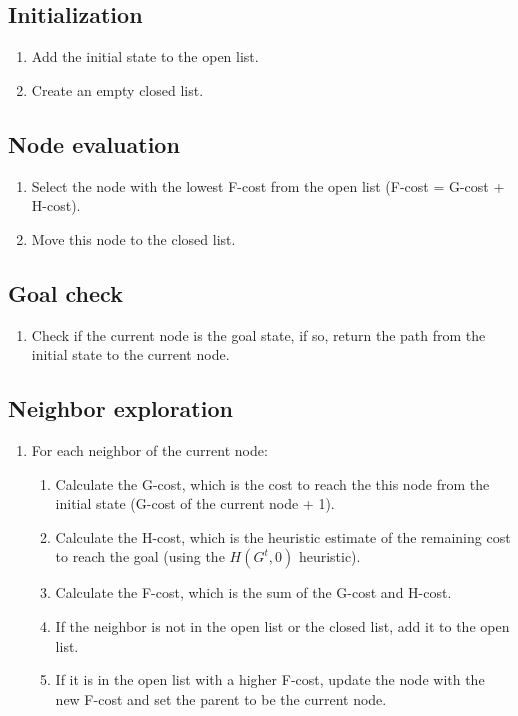\subsection{Initialization}
\begin{enumerate}
    \item Add the initial state to the open list.
    \item Create an empty closed list.
\end{enumerate}

\subsection{Node evaluation}
\begin{enumerate}
    \item Select the node with the lowest F-cost from the open list (F-cost = G-cost + H-cost).
    \item Move this node to the closed list.
\end{enumerate}

\subsection{Goal check}
\begin{enumerate}
    \item Check if the current node is the goal state, if so, return the path from the initial state to the current node.
\end{enumerate}

\subsection{Neighbor exploration}
\begin{enumerate}
    \item For each neighbor of the current node:
    \begin{enumerate}
        \item Calculate the G-cost, which is the cost to reach the this node from the initial state (G-cost of the current node + 1).
        \item Calculate the H-cost, which is the heuristic estimate of the remaining cost to reach the goal (using the $H(G^t, 0)$ heuristic).
        \item Calculate the F-cost, which is the sum of the G-cost and H-cost.
        \item If the neighbor is not in the open list or the closed list, add it to the open list.
        \item If it is in the open list with a higher F-cost, update the node with the new F-cost and set the parent to be the current node.
    \end{enumerate}
\end{enumerate}

